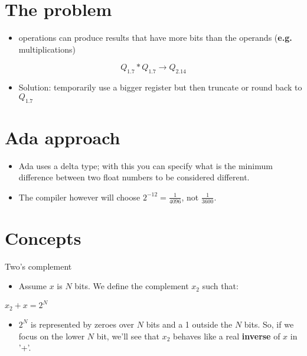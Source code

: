 \documentclass[bigger]{beamer}
\begin{document}
\section{The problem}
\label{sec-4}

\begin{itemize}
\item operations can produce results that have more bits than the operands (\textbf{e.g.} multiplications)
\end{itemize}

$$Q_{1.7} * Q_{1.7} \rightarrow Q_{2.14}$$

\begin{itemize}
\item Solution: temporarily use a bigger register but then truncate or round back to $Q_{1.7}$
\end{itemize}

\section{Ada approach}
\label{sec-5}

\begin{itemize}
\item Ada uses a delta type; with this you can specify what is the minimum difference between two float numbers to be
considered different.
\end{itemize}


\begin{itemize}
\item The compiler however will choose $2^{-12} = \frac{1}{4096}$, not $\frac{1}{3600}$.
\end{itemize}

\section{Concepts}
\label{sec-6}

Two's complement

\begin{itemize}
\item Assume $x$ is $N$ bits. We define the complement $x_2$ such that:
\end{itemize}

$x_2 + x = 2^N$

\begin{itemize}
\item $2^N$ is represented by zeroes over $N$ bits and a 1 outside the $N$ bits. So, if we focus on the lower $N$ bit,
we'll see that $x_2$ behaves like a real \textbf{inverse} of $x$ in '+'.
\end{itemize}
\end{document}
